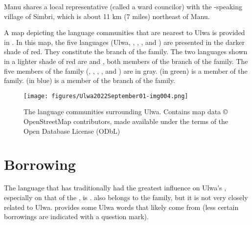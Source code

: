 Manu shares a local representative (called a ward councilor) with the -speaking village of Simbri, which is about 11 km (7 miles) northeast of Manu.

A map depicting the language communities that are nearest to Ulwa is provided in . In this map, the five  languages (Ulwa, , , , and ) are presented in the darker shade of red. They constitute the  branch of the  family. The two languages shown in a lighter shade of red are  and , both members of the  branch of the  family. The five members of the  family (, , , , and ) are in gray.  (in green) is a member of the  family.  (in blue) is a member of the  branch of the  family.

\begin{figure}
\caption{The language communities surrounding Ulwa. Contains map data © OpenStreetMap contributors, made available under the terms of the Open Database License (ODbL)}
\label{fig:1.4}
\texttt{[image: figures/Ulwa2022September01-img004.png]}
\end{figure}

\section{Borrowing}\label{sec:1.5.6}


The language that has traditionally had the greatest influence on Ulwa’s , especially on that of the  , is .  also belongs to the  family, but it is not very closely related to Ulwa.  provides some Ulwa words that likely come from  (less certain borrowings are indicated with a question mark).


